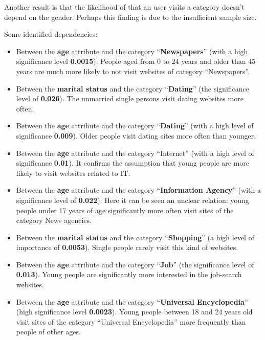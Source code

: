 \documentclass[runningheads,a4paper]{llncs}
\begin{document}
Another result is that the likelihood of that an user visits a category doesn't depend on the gender. Perhaps this finding is due to the insufficient sample size.

Some identified dependencies:

\begin{itemize}
	\item Between the \textbf{age} attribute and the category ``\textbf{Newspapers}'' (with a high significance level \textbf{0.0015}). People aged from 0 to 24 years and older than 45 years are much more likely to not visit websites of category ``Newspapers''.

	\item Between the \textbf{marital status} and the category ``\textbf{Dating}'' (the significance level of \textbf{0.026}). The unmarried single persons visit dating websites more often.
	
	\item Between the \textbf{age} attribute and the category ``\textbf{Dating}'' (with a high level of significance \textbf{0.009}). Older people visit dating sites more often than younger.
	
	\item Between the \textbf{age} attribute and the category ``Internet'' (with a high level of significance \textbf{0.01}). It confirms the assumption that young people are more likely to visit websites related to IT.
	
	\item Between the \textbf{age} attribute and the category ``\textbf{Information Agency}'' (with a significance level of \textbf{0.022}). Here it can be seen an unclear relation: young people under 17 years of age significantly more often visit sites of the category News agencies.
	
	\item Between the \textbf{marital status} and the category ``\textbf{Shopping}'' (a high level of importance of \textbf{0.0053}). Single people rarely visit this kind of websites.
	
	\item Between the \textbf{age} attribute and the category ``\textbf{Job}'' (the significance level of \textbf{0.013}). Young people are significantly more interested in the job-search websites.
	
	\item Between the \textbf{age} attribute and the category ``\textbf{Universal Encyclopedia}'' (high significance level \textbf{0.0023}). 
	Young people between 18 and 24 years old visit sites of the category ``Universal Encyclopedia'' more frequently than people of other ages.
	

\end{itemize}
\end{document}
